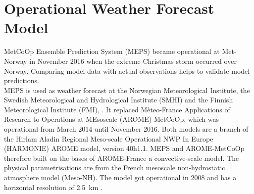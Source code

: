 \section{Operational Weather Forecast Model}\label{sec:DIM:MEPS}
MetCoOp Ensemble Prediction System (MEPS) became operational at Met-Norway in November 2016 when the extreme Christmas storm occurred over Norway. Comparing model data with actual observations helps to validate %
model predictions. %
\\
MEPS is used as weather forecast at the Norwegian Meteorological Institute, the Swedish Meteorological and Hydrological Institute (SMHI) and the Finnish Meteorological Institute (FMI), \citep{muller_arome-metcoop:_2017, koltzow_metcoop_2017}.
It replaced Mèteo-France Applications of Research to Operations at MEsoscale (AROME)-MetCoOp, which was operational from March 2014 until November 2016. %
Both models are a branch of the Hirlam Aladin Regional Meso-scale Operational NWP In Europe (HARMONIE) AROME model, version 40h1.1. MEPS and AROME-MetCoOp therefore built on the bases of AROME-France a convective-scale model. The physical parametrisations are from the French mesoscale non-hydrostatic atmosphere model (Meso-NH). The model got operational in 2008 and has a horizontal resolution of \SI{2.5}{\km} \citep{seity_arome-france_2010}. 

